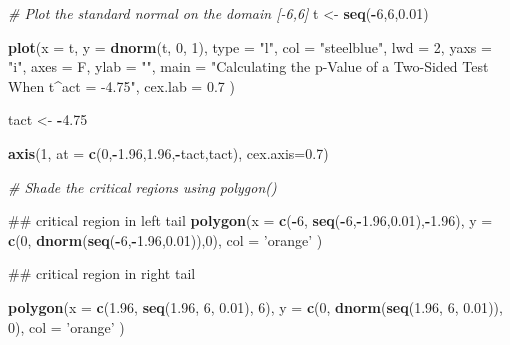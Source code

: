 \documentclass[]{book}
\newenvironment{Shaded}{\begin{snugshade}}{\end{snugshade}}
\newcommand{\KeywordTok}[1]{\textcolor[rgb]{0.13,0.29,0.53}{\textbf{#1}}}
\newcommand{\DataTypeTok}[1]{\textcolor[rgb]{0.13,0.29,0.53}{#1}}
\newcommand{\DecValTok}[1]{\textcolor[rgb]{0.00,0.00,0.81}{#1}}
\newcommand{\FloatTok}[1]{\textcolor[rgb]{0.00,0.00,0.81}{#1}}
\newcommand{\StringTok}[1]{\textcolor[rgb]{0.31,0.60,0.02}{#1}}
\newcommand{\CommentTok}[1]{\textcolor[rgb]{0.56,0.35,0.01}{\textit{#1}}}
\newcommand{\OperatorTok}[1]{\textcolor[rgb]{0.81,0.36,0.00}{\textbf{#1}}}
\newcommand{\NormalTok}[1]{#1}
\theoremstyle{definition}
\theoremstyle{definition}
\theoremstyle{definition}
\theoremstyle{remark}
\begin{document}
\begin{Shaded}
\begin{Highlighting}[]
\CommentTok{# Plot the standard normal on the domain [-6,6]}
\NormalTok{t <-}\StringTok{ }\KeywordTok{seq}\NormalTok{(}\OperatorTok{-}\DecValTok{6}\NormalTok{,}\DecValTok{6}\NormalTok{,}\FloatTok{0.01}\NormalTok{)}

\KeywordTok{plot}\NormalTok{(}\DataTypeTok{x =}\NormalTok{ t, }
     \DataTypeTok{y =} \KeywordTok{dnorm}\NormalTok{(t, }\DecValTok{0}\NormalTok{, }\DecValTok{1}\NormalTok{), }
     \DataTypeTok{type =} \StringTok{"l"}\NormalTok{, }
     \DataTypeTok{col =} \StringTok{"steelblue"}\NormalTok{, }
     \DataTypeTok{lwd =} \DecValTok{2}\NormalTok{, }
     \DataTypeTok{yaxs =} \StringTok{"i"}\NormalTok{, }
     \DataTypeTok{axes =}\NormalTok{ F, }
     \DataTypeTok{ylab =} \StringTok{""}\NormalTok{, }
     \DataTypeTok{main =} \StringTok{"Calculating the p-Value of a Two-Sided Test When t^act = -4.75"}\NormalTok{, }
     \DataTypeTok{cex.lab =} \FloatTok{0.7}
\NormalTok{     )}

\NormalTok{tact <-}\StringTok{ }\OperatorTok{-}\FloatTok{4.75}

\KeywordTok{axis}\NormalTok{(}\DecValTok{1}\NormalTok{, }\DataTypeTok{at =} \KeywordTok{c}\NormalTok{(}\DecValTok{0}\NormalTok{,}\OperatorTok{-}\FloatTok{1.96}\NormalTok{,}\FloatTok{1.96}\NormalTok{,}\OperatorTok{-}\NormalTok{tact,tact), }\DataTypeTok{cex.axis=}\FloatTok{0.7}\NormalTok{)}

\CommentTok{# Shade the critical regions using polygon()}

\NormalTok{## critical region in left tail}
\KeywordTok{polygon}\NormalTok{(}\DataTypeTok{x =} \KeywordTok{c}\NormalTok{(}\OperatorTok{-}\DecValTok{6}\NormalTok{, }\KeywordTok{seq}\NormalTok{(}\OperatorTok{-}\DecValTok{6}\NormalTok{,}\OperatorTok{-}\FloatTok{1.96}\NormalTok{,}\FloatTok{0.01}\NormalTok{),}\OperatorTok{-}\FloatTok{1.96}\NormalTok{),}
        \DataTypeTok{y =} \KeywordTok{c}\NormalTok{(}\DecValTok{0}\NormalTok{, }\KeywordTok{dnorm}\NormalTok{(}\KeywordTok{seq}\NormalTok{(}\OperatorTok{-}\DecValTok{6}\NormalTok{,}\OperatorTok{-}\FloatTok{1.96}\NormalTok{,}\FloatTok{0.01}\NormalTok{)),}\DecValTok{0}\NormalTok{), }
        \DataTypeTok{col =} \StringTok{'orange'}
\NormalTok{        )}

\NormalTok{## critical region in right tail}

\KeywordTok{polygon}\NormalTok{(}\DataTypeTok{x =} \KeywordTok{c}\NormalTok{(}\FloatTok{1.96}\NormalTok{, }\KeywordTok{seq}\NormalTok{(}\FloatTok{1.96}\NormalTok{, }\DecValTok{6}\NormalTok{, }\FloatTok{0.01}\NormalTok{), }\DecValTok{6}\NormalTok{),}
        \DataTypeTok{y =} \KeywordTok{c}\NormalTok{(}\DecValTok{0}\NormalTok{, }\KeywordTok{dnorm}\NormalTok{(}\KeywordTok{seq}\NormalTok{(}\FloatTok{1.96}\NormalTok{, }\DecValTok{6}\NormalTok{, }\FloatTok{0.01}\NormalTok{)), }\DecValTok{0}\NormalTok{), }
        \DataTypeTok{col =} \StringTok{'orange'}
\NormalTok{        )}


\end{Highlighting}
\end{Shaded}
\end{document}
